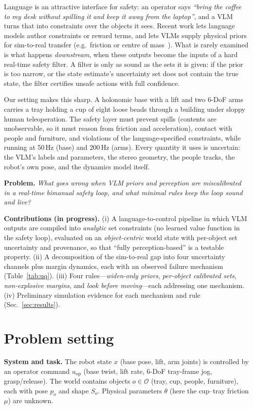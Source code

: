 \documentclass[10pt,twocolumn,letterpaper]{article}
\begin{document}
Language is an attractive interface for safety: an operator says \emph{``bring the coffee to my desk without spilling it and keep it away
from the laptop''}, and a VLM turns that into constraints over the objects it sees. Recent work lets language models author constraints
or reward terms, and lets VLMs supply physical priors for sim-to-real transfer (e.g.\ friction or centre of mass~\cite{phys2real}).
What is rarely examined is what happens \emph{downstream}, when these outputs become the inputs of a hard real-time safety filter.
A filter is only as sound as the sets it is given: if the prior is too narrow, or the state estimate's uncertainty set does not contain
the true state, the filter certifies unsafe actions with full confidence.

Our setting makes this sharp. A holonomic base with a lift and two 6-DoF arms carries a tray holding a cup of eight loose beads through
a building under sloppy human teleoperation. The safety layer must prevent spills (contents are unobservable, so it must reason from
friction and acceleration), contact with people and furniture, and violations of the language-specified constraints, while running at
50\,Hz (base) and 200\,Hz (arms). Every quantity it uses is uncertain: the VLM's labels and parameters, the stereo geometry, the people
tracks, the robot's own pose, and the dynamics model itself.

\textbf{Problem.} \emph{What goes wrong when VLM priors and perception are miscalibrated in a real-time bimanual safety loop, and what
minimal rules keep the loop sound and live?}

\textbf{Contributions (in progress).}
(i) A language-to-control pipeline in which VLM outputs are compiled into \emph{analytic} set constraints (no learned value function in
the safety loop), evaluated on an \emph{object-centric} world state with per-object set uncertainty and provenance, so that ``fully
perception-based'' is a testable property.
(ii) A decomposition of the sim-to-real gap into four uncertainty channels plus margin dynamics, each with an observed failure mechanism
(Table~\ref{tab:uq}).
(iii) Four rules---\emph{widen-only priors}, \emph{per-object calibrated sets}, \emph{non-explosive margins}, and \emph{look before
moving}---each addressing one mechanism.
(iv) Preliminary simulation evidence for each mechanism and rule (Sec.~\ref{sec:results}).

\section{Problem setting}\label{sec:setting}
\textbf{System and task.} The robot state $x$ (base pose, lift, arm joints) is controlled by an operator command $u_{\mathrm{op}}$ (base
twist, lift rate, 6-DoF tray-frame jog, grasp/release). The world contains objects $o\in\mathcal{O}$ (tray, cup, people, furniture), each
with pose $p_o$ and shape $S_o$. Physical parameters $\theta$ (here the cup--tray friction $\mu$) are unknown.
\end{document}
